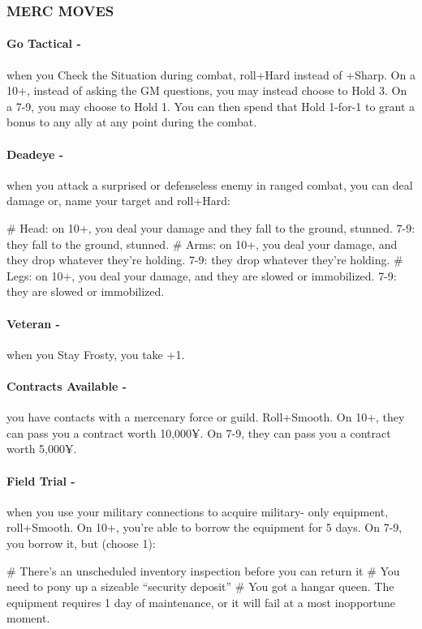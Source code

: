 \subsubsection{MERC MOVES}
\paragraph{Go Tactical -} when you Check the Situation during combat, roll+Hard instead of +Sharp. On a 10+, instead of asking the GM questions, you may instead choose to Hold 3. On a 7-9, you may choose to Hold 1. You can then spend that Hold 1-for-1 to grant a bonus to any ally at any point during the combat.

\paragraph{Deadeye -} when you attack a surprised or defenseless enemy in ranged combat, you can deal damage or, name your target and roll+Hard:
    \begin{easylist}
        # Head: on 10+, you deal your damage and they fall to the ground, stunned. 7-9: they fall to the ground, stunned.
        # Arms: on 10+, you deal your damage, and they drop whatever they’re holding. 7-9: they drop whatever they’re holding.
        # Legs: on 10+, you deal your damage, and they are slowed or immobilized. 7-9: they are slowed or immobilized.
    \end{easylist}

\paragraph{Veteran -} when you Stay Frosty, you take +1.

\paragraph{Contracts Available -} you have contacts with a mercenary force or guild. Roll+Smooth. On 10+, they can pass you a contract worth 10,000¥. On 7-9, they can pass you a contract worth 5,000¥.

\paragraph{Field Trial -} when you use your military connections to acquire military- only equipment, roll+Smooth. On 10+, you’re able to borrow the equipment for 5 days. On 7-9, you borrow it, but (choose 1):
    \begin{easylist}
        # There’s an unscheduled inventory inspection before you can return it
        # You need to pony up a sizeable ``security deposit''
        # You got a hangar queen. The equipment requires 1 day of maintenance, or it will fail at a most inopportune moment.
    \end{easylist}

